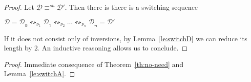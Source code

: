 \documentclass[a4paper,UKenglish,cleveref,pdftex,thm-restate,numberwithinsect,anonymous]{lipics}
\newcommand{\dder}[1]{\mathscr{#1}}
\newcommand{\der}[1]{\underline{\dder{#1}}}
\newcommand{\shift}[1]{\ensuremath{\mathrel{{\leftrightsquigarrow}_{#1}}}}
\newcommand{\shifteq}[1][]{\ensuremath{\mathrel{{\equiv}^\mathit{sh}_{#1}}}}
\begin{document}
\thNoNeed*
\label{thNoNeed-proof}


\begin{proof}
  Let $\der{D} \shifteq \der{D}'$. Then there is there is a switching
  sequence
  \begin{center}
    $\der{D} = \der{D}_0 \shift{\nu_1} \der{D}_1 \shift{\nu_2} \ldots
    \shift{\nu_n} \der{D}_n=\der{D}'$
  \end{center}
  If it does not consist only of inversions, by Lemma~\ref{le:switchD}
  we can reduce its length by $2$. An inductive reasoning allows us to
  conclude.
\end{proof}


\coCanonical*
\label{coCanonical-proof}

\begin{proof}
  Immediate consequence of Theorem~\ref{th:no-need} and Lemma~\ref{le:switchA}.
\end{proof}
\end{document}
